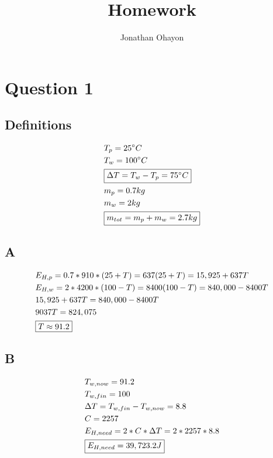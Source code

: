 \documentclass[12pt, oneside]{article}
\title{Homework}
\author{Jonathan Ohayon}
\begin{document}
\maketitle

\section{Question 1}
\setcounter{subsection}{-1}
\subsection{Definitions}
\begin{eqnarray*}
& T_{p} = 25^{\circ}C\\
& T_{w} = 100^{\circ}C\\
& \framebox{$\Delta T = T_{w} - T_{p} = 75^{\circ}C$}\\
& m_{p} = 0.7kg\\
& m_{w} = 2kg\\
& \framebox{$m_{tot} = m_{p} + m_{w} = 2.7kg$}\\
\end{eqnarray*}

\subsection{A}
\begin{eqnarray*}
& E_{H,p} = 0.7 * 910 * (25 + T) = 637(25 + T) = 15,925 + 637T\\
& E_{H,w} = 2 * 4200 * (100 - T) = 8400(100 - T) = 840,000 - 8400T\\
& 15,925 + 637T = 840,000 - 8400T\\
& 9037T = 824,075\\
& \framebox{$T \approx 91.2$}
\end{eqnarray*}
\clearpage

\subsection{B}
\begin{eqnarray*}
& T_{w,now} = 91.2\\
& T_{w,fin} = 100\\
& \Delta T = T_{w,fin} - T_{w,now} = 8.8\\
& C = 2257\\
& E_{H,need} = 2 * C * \Delta T = 2 * 2257 * 8.8\\
& \framebox{$E_{H,need} = 39,723.2J$}
\end{eqnarray*}
\end{document}

